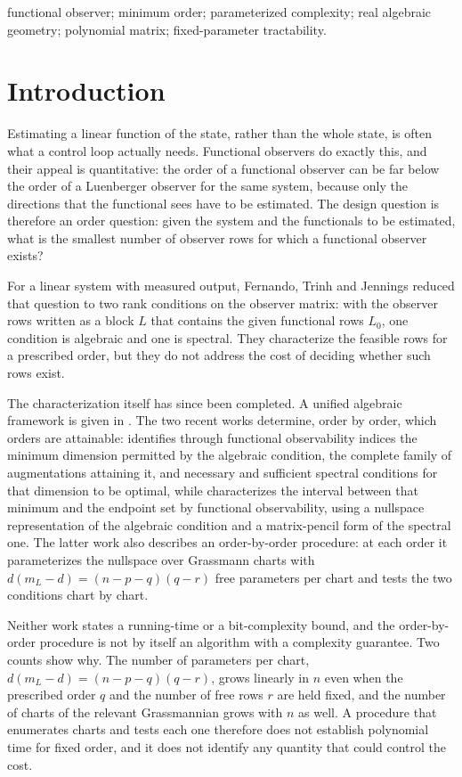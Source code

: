 \documentclass[journal]{IEEEtran}
\theoremstyle{plainn}
\theoremstyle{remark}
\begin{document}
\begin{IEEEkeywords}
functional observer; minimum order; parameterized complexity; real algebraic geometry; polynomial matrix; fixed-parameter tractability.
\end{IEEEkeywords}

\section{Introduction}\label{sec:intro}

Estimating a linear function of the state, rather than the whole state, is often what a
control loop actually needs. Functional observers do exactly this, and their appeal is
quantitative: the order of a functional observer can be far below the order of a
Luenberger observer for the same system, because only the directions that the functional
sees have to be estimated. The design question is therefore an order question: given the
system and the functionals to be estimated, what is the smallest number of observer rows
for which a functional observer exists?

For a linear system with measured output, Fernando, Trinh and Jennings \cite{fer10}
reduced that question to two rank conditions on the observer matrix: with the observer
rows written as a block $L$ that contains the given functional rows $L_0$, one condition
is algebraic and one is spectral. They characterize the feasible rows for a prescribed
order, but they do not address the cost of deciding whether such rows exist.

The characterization itself has since been completed. A unified algebraic framework is
given in \cite{dar25}. The two recent works \cite{fer26a,fer26b} determine, order by
order, which orders are attainable: \cite{fer26a} identifies through functional
observability indices the minimum dimension permitted by the algebraic condition, the
complete family of augmentations attaining it, and necessary and sufficient spectral
conditions for that dimension to be optimal, while \cite{fer26b} characterizes the
interval between that minimum and the endpoint set by functional observability, using a
nullspace representation of the algebraic condition and a matrix-pencil form of the
spectral one. The latter work also describes an order-by-order procedure: at each order
it parameterizes the nullspace over Grassmann charts with $d(m_L-d)=(n-p-q)(q-r)$ free
parameters per chart and tests the two conditions chart by chart.

Neither work states a running-time or a bit-complexity bound, and the order-by-order
procedure is not by itself an algorithm with a complexity guarantee. Two counts show why. The
number of parameters per chart, $d(m_L-d)=(n-p-q)(q-r)$, grows linearly in $n$ even when the
prescribed order $q$ and the number of free rows $r$ are held fixed, and the number of charts
of the relevant Grassmannian grows with $n$ as well. A procedure that enumerates charts and
tests each one therefore does not establish polynomial time for fixed order, and it does not
identify any quantity that could control the cost.
\end{document}
